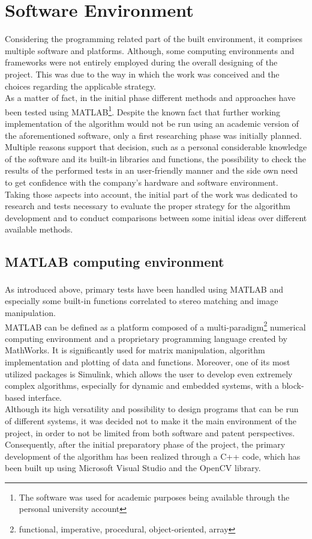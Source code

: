\section{Software Environment}
\label{section:software-env}

Considering the programming related part of the built environment, it comprises multiple software and platforms. 
Although, some computing environments and frameworks were not entirely employed during the overall designing of the project.
This was due to the way in which the work was conceived and the choices regarding the applicable strategy. \\
As a matter of fact, in the initial phase different methods and approaches have been tested using MATLAB\footnote{The software was used for academic purposes being available through the personal university account}. 
Despite the known fact that further working implementation of the algorithm would not be run using an academic version of the aforementioned software, only a first researching phase was initially planned.
Multiple reasons support that decision, such as a personal considerable knowledge of the software and its built-in libraries and functions, the possibility to check the results of the performed tests in an user-friendly manner and the side own need to get confidence with the company's hardware and software environment.\\
Taking those aspects into account, the initial part of the work was dedicated to research and tests necessary to evaluate the proper strategy for the algorithm development and to conduct comparisons between some initial ideas over different available methods.

\subsection{MATLAB computing environment}
\label{subsection:matlab-env}
As introduced above, primary tests have been handled using MATLAB\textsuperscript{\textregistered} and especially some built-in functions correlated to stereo matching and image manipulation.\\
MATLAB can be defined as a platform composed of a multi-paradigm\footnote{functional, imperative, procedural, object-oriented, array} numerical computing environment and a proprietary programming language created by MathWorks.
It is significantly used for matrix manipulation, algorithm implementation and plotting of data and functions.
Moreover, one of its most utilized packages is Simulink, which allows the user to develop even extremely complex algorithms, especially for dynamic and embedded systems, with a block-based interface. \\
Although its high versatility and possibility to design programs that can be run of different systems, it was decided not to make it the main environment of the project, in order to not be limited from both software and patent perspectives.\\
Consequently, after the initial preparatory phase of the project, the primary development of the algorithm has been realized through a C++ code, which has been built up using Microsoft Visual Studio and the OpenCV library. 

